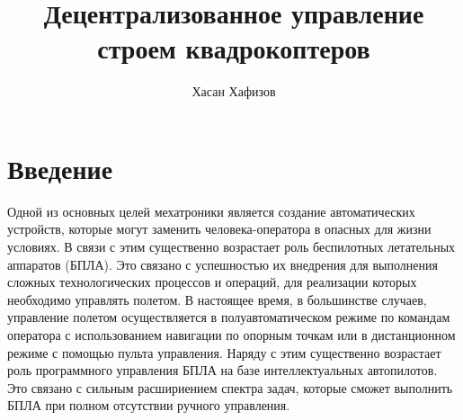 \documentclass[a4paper, 14pt]{extarticle}
\author{Хасан Хафизов}
\title{Децентрализованное управление строем квадрокоптеров}
\begin{document}
	\maketitle
	\tableofcontents
\section{Введение}
Одной из основных целей мехатроники
является создание автоматических устройств, которые могут заменить
человека-оператора в опасных для жизни условиях. В связи с этим
существенно возрастает роль беспилотных летательных аппаратов (БПЛА).
Это связано с успешностью их внедрения для выполнения сложных
технологических процессов и операций, для реализации которых
необходимо управлять полетом. В настоящее время, в большинстве случаев, управление полетом
осуществляется в полуавтоматическом режиме по командам оператора с
использованием навигации по опорным точкам или в дистанционном режиме
с помощью пульта управления. Наряду с этим существенно возрастает роль
программного управления БПЛА на базе интеллектуальных автопилотов. Это связано с сильным расшириением спектра задач, которые сможет выполнить БПЛА при полном отсутствии ручного управления. \par
\end{document}
